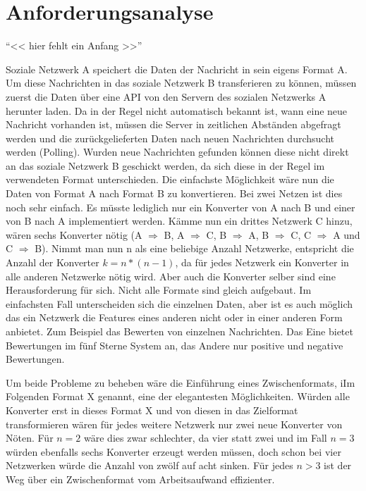 
\chapter{Anforderungsanalyse}
\label{ch:requirementanalysis}

\enquote{<< hier fehlt ein Anfang >>}

Soziale Netzwerk A speichert die Daten der Nachricht in sein eigens Format A. Um diese Nachrichten  in das soziale Netzwerk B transferieren zu können, müssen zuerst die Daten über eine API von den Servern des sozialen Netzwerks A herunter laden. Da in der Regel nicht automatisch bekannt ist, wann eine neue Nachricht vorhanden ist, müssen die Server in zeitlichen Abständen abgefragt werden und die zurückgelieferten Daten nach neuen Nachrichten durchsucht werden (Polling). Wurden neue Nachrichten gefunden können diese nicht direkt an das soziale Netzwerk B geschickt werden, da sich diese in der Regel im verwendeten Format unterschieden. Die einfachste Möglichkeit wäre nun die Daten von Format A nach Format B zu konvertieren. Bei zwei Netzen ist dies noch sehr einfach. Es müsste lediglich nur ein Konverter von A nach B und einer von B nach A implementiert werden. Kämme nun ein drittes Netzwerk C hinzu, wären sechs Konverter nötig (A $\Rightarrow$ B, A $\Rightarrow$ C, B $\Rightarrow$ A, B $\Rightarrow$ C, C $\Rightarrow$ A und C $\Rightarrow$ B). Nimmt man nun n als eine beliebige Anzahl Netzwerke, entspricht die Anzahl der Konverter $k= n*(n-1)$, da für jedes Netzwerk ein Konverter in alle anderen Netzwerke nötig wird. Aber auch die Konverter selber sind eine Herausforderung für sich. Nicht alle Formate sind gleich aufgebaut. Im einfachsten Fall unterscheiden sich die einzelnen Daten, aber ist es auch möglich das ein Netzwerk die Features eines anderen nicht oder in einer anderen Form anbietet. Zum Beispiel das Bewerten von einzelnen Nachrichten. Das Eine bietet Bewertungen im fünf Sterne System an, das Andere nur positive und negative Bewertungen. 

Um beide Probleme zu beheben wäre die Einführung eines Zwischenformats, iIm Folgenden Format X genannt, eine der elegantesten Möglichkeiten. Würden alle Konverter erst in dieses Format X und von diesen in das Zielformat transformieren wären für jedes weitere Netzwerk nur zwei neue Konverter von Nöten. Für $n=2$ wäre dies zwar schlechter, da vier statt zwei und im Fall $n=3$würden ebenfalls sechs Konverter erzeugt werden müssen, doch schon bei vier Netzwerken würde die Anzahl von zwölf auf acht sinken. Für jedes $n>3$ ist der Weg über ein Zwischenformat vom Arbeitsaufwand effizienter. 

